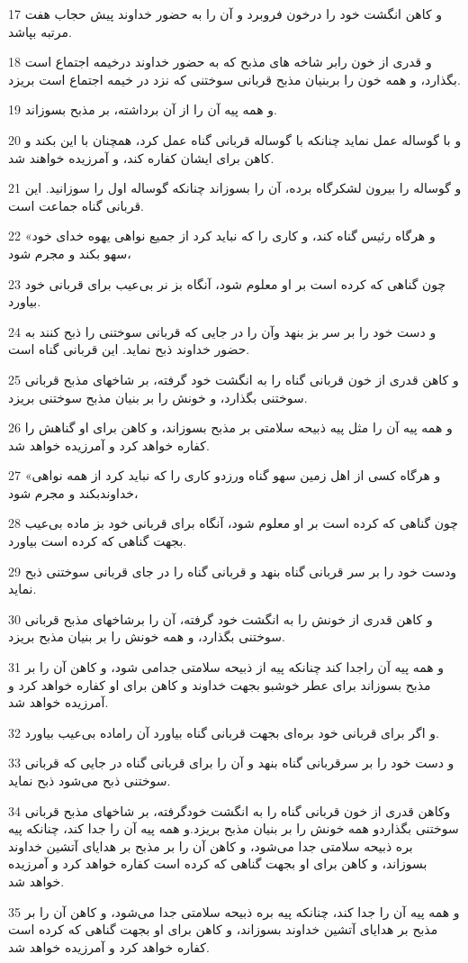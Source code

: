 \par 17 و کاهن انگشت خود را درخون فروبرد و آن را به حضور خداوند پیش حجاب هفت مرتبه بپاشد.
\par 18 و قدری از خون رابر شاخه های مذبح که به حضور خداوند درخیمه اجتماع است بگذارد، و همه خون را بربنیان مذبح قربانی سوختنی که نزد در خیمه اجتماع است بریزد.
\par 19 و همه پیه آن را از آن برداشته، بر مذبح بسوزاند.
\par 20 و با گوساله عمل نماید چنانکه با گوساله قربانی گناه عمل کرد، همچنان با این بکند و کاهن برای ایشان کفاره کند، و آمرزیده خواهند شد.
\par 21 و گوساله را بیرون لشکرگاه برده، آن را بسوزاند چنانکه گوساله اول را سوزانید. این قربانی گناه جماعت است.
\par 22 «و هرگاه رئیس گناه کند، و کاری را که نباید کرد از جمیع نواهی یهوه خدای خود سهو بکند و مجرم شود،
\par 23 چون گناهی که کرده است بر او معلوم شود، آنگاه بز نر بی‌عیب برای قربانی خود بیاورد.
\par 24 و دست خود را بر سر بز بنهد وآن را در جایی که قربانی سوختنی را ذبح کنند به حضور خداوند ذبح نماید. این قربانی گناه است.
\par 25 و کاهن قدری از خون قربانی گناه را به انگشت خود گرفته، بر شاخهای مذبح قربانی سوختنی بگذارد، و خونش را بر بنیان مذبح سوختنی بریزد.
\par 26 و همه پیه آن را مثل پیه ذبیحه سلامتی بر مذبح بسوزاند، و کاهن برای او گناهش را کفاره خواهد کرد و آمرزیده خواهد شد.
\par 27 «و هرگاه کسی از اهل زمین سهو گناه ورزدو کاری را که نباید کرد از همه نواهی خداوندبکند و مجرم شود،
\par 28 چون گناهی که کرده است بر او معلوم شود، آنگاه برای قربانی خود بز ماده بی‌عیب بجهت گناهی که کرده است بیاورد.
\par 29 ودست خود را بر سر قربانی گناه بنهد و قربانی گناه را در جای قربانی سوختنی ذبح نماید.
\par 30 و کاهن قدری از خونش را به انگشت خود گرفته، آن را برشاخهای مذبح قربانی سوختنی بگذارد، و همه خونش را بر بنیان مذبح بریزد.
\par 31 و همه پیه آن راجدا کند چنانکه پیه از ذبیحه سلامتی جدامی شود، و کاهن آن را بر مذبح بسوزاند برای عطر خوشبو بجهت خداوند و کاهن برای او کفاره خواهد کرد و آمرزیده خواهد شد.
\par 32 و اگر برای قربانی خود بره‌ای بجهت قربانی گناه بیاورد آن راماده بی‌عیب بیاورد.
\par 33 و دست خود را بر سرقربانی گناه بنهد و آن را برای قربانی گناه در جایی که قربانی سوختنی ذبح می‌شود ذبح نماید.
\par 34 وکاهن قدری از خون قربانی گناه را به انگشت خودگرفته، بر شاخهای مذبح قربانی سوختنی بگذاردو همه خونش را بر بنیان مذبح بریزد.و همه پیه آن را جدا کند، چنانکه پیه بره ذبیحه سلامتی جدا می‌شود، و کاهن آن را بر مذبح بر هدایای آتشین خداوند بسوزاند، و کاهن برای او بجهت گناهی که کرده است کفاره خواهد کرد و آمرزیده خواهد شد. 
\par 35 و همه پیه آن را جدا کند، چنانکه پیه بره ذبیحه سلامتی جدا می‌شود، و کاهن آن را بر مذبح بر هدایای آتشین خداوند بسوزاند، و کاهن برای او بجهت گناهی که کرده است کفاره خواهد کرد و آمرزیده خواهد شد.
 
